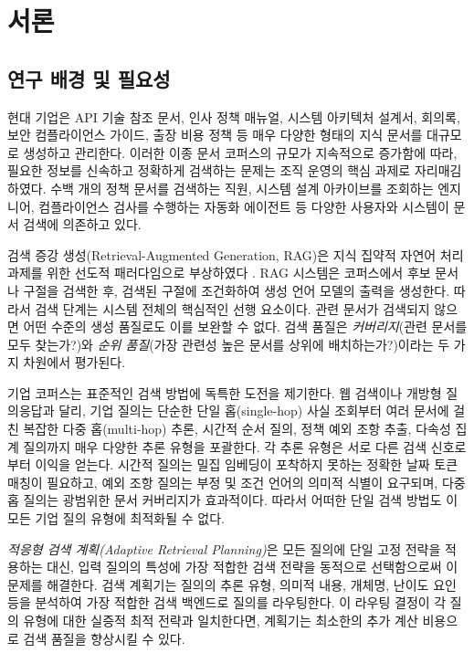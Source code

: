 \chapter{서론}
\label{chap:introduction_ko}

\section{연구 배경 및 필요성}
\label{sec:intro_motivation_ko}

현대 기업은 API 기술 참조 문서, 인사 정책 매뉴얼, 시스템 아키텍처 설계서, 회의록, 보안 컴플라이언스 가이드, 출장 비용 정책 등 매우 다양한 형태의 지식 문서를 대규모로 생성하고 관리한다. 이러한 이종 문서 코퍼스의 규모가 지속적으로 증가함에 따라, 필요한 정보를 신속하고 정확하게 검색하는 문제는 조직 운영의 핵심 과제로 자리매김하였다. 수백 개의 정책 문서를 검색하는 직원, 시스템 설계 아카이브를 조회하는 엔지니어, 컴플라이언스 검사를 수행하는 자동화 에이전트 등 다양한 사용자와 시스템이 문서 검색에 의존하고 있다.

검색 증강 생성(Retrieval-Augmented Generation, RAG)은 지식 집약적 자연어 처리 과제를 위한 선도적 패러다임으로 부상하였다 \citep{lewis2020rag}. RAG 시스템은 코퍼스에서 후보 문서나 구절을 검색한 후, 검색된 구절에 조건화하여 생성 언어 모델의 출력을 생성한다. 따라서 검색 단계는 시스템 전체의 핵심적인 선행 요소이다. 관련 문서가 검색되지 않으면 어떤 수준의 생성 품질로도 이를 보완할 수 없다. 검색 품질은 \emph{커버리지}(관련 문서를 모두 찾는가?)와 \emph{순위 품질}(가장 관련성 높은 문서를 상위에 배치하는가?)이라는 두 가지 차원에서 평가된다.

기업 코퍼스는 표준적인 검색 방법에 독특한 도전을 제기한다. 웹 검색이나 개방형 질의응답과 달리, 기업 질의는 단순한 단일 홉(single-hop) 사실 조회부터 여러 문서에 걸친 복잡한 다중 홉(multi-hop) 추론, 시간적 순서 질의, 정책 예외 조항 추출, 다속성 집계 질의까지 매우 다양한 추론 유형을 포괄한다. 각 추론 유형은 서로 다른 검색 신호로부터 이익을 얻는다. 시간적 질의는 밀집 임베딩이 포착하지 못하는 정확한 날짜 토큰 매칭이 필요하고, 예외 조항 질의는 부정 및 조건 언어의 의미적 식별이 요구되며, 다중 홉 질의는 광범위한 문서 커버리지가 효과적이다. 따라서 어떠한 단일 검색 방법도 이 모든 기업 질의 유형에 최적화될 수 없다.

\emph{적응형 검색 계획(Adaptive Retrieval Planning)}은 모든 질의에 단일 고정 전략을 적용하는 대신, 입력 질의의 특성에 가장 적합한 검색 전략을 동적으로 선택함으로써 이 문제를 해결한다. 검색 계획기는 질의의 추론 유형, 의미적 내용, 개체명, 난이도 요인 등을 분석하여 가장 적합한 검색 백엔드로 질의를 라우팅한다. 이 라우팅 결정이 각 질의 유형에 대한 실증적 최적 전략과 일치한다면, 계획기는 최소한의 추가 계산 비용으로 검색 품질을 향상시킬 수 있다.

